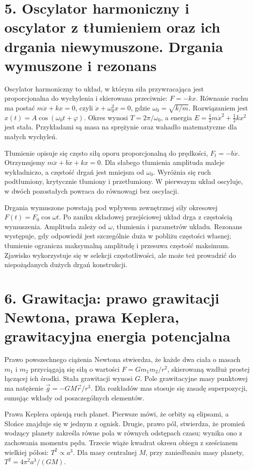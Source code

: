 \documentclass[11pt,a4paper,oneside]{report}
\begin{document}
\section{5. Oscylator harmoniczny i oscylator z tłumieniem oraz ich drgania niewymuszone. Drgania wymuszone i rezonans}
Oscylator harmoniczny to układ, w którym siła przywracająca jest proporcjonalna do wychylenia i skierowana przeciwnie: \(F=-kx\). Równanie ruchu ma postać \(m\ddot x+kx=0\), czyli \(\ddot x+\omega_0^2x=0\), gdzie \(\omega_0=\sqrt{k/m}\). Rozwiązaniem jest \(x(t)=A\cos(\omega_0t+\varphi)\). Okres wynosi \(T=2\pi/\omega_0\), a energia \(E=\frac12m\dot x^2+\frac12kx^2\) jest stała. Przykładami są masa na sprężynie oraz wahadło matematyczne dla małych wychyleń.

Tłumienie opisuje się często siłą oporu proporcjonalną do prędkości, \(F_t=-b\dot x\). Otrzymujemy \(m\ddot x+b\dot x+kx=0\). Dla słabego tłumienia amplituda maleje wykładniczo, a częstość drgań jest mniejsza od \(\omega_0\). Wyróżnia się ruch podtłumiony, krytycznie tłumiony i przetłumiony. W pierwszym układ oscyluje, w dwóch pozostałych powraca do równowagi bez oscylacji.

Drgania wymuszone powstają pod wpływem zewnętrznej siły okresowej \(F(t)=F_0\cos\omega t\). Po zaniku składowej przejściowej układ drga z częstością wymuszenia. Amplituda zależy od \(\omega\), tłumienia i parametrów układu. Rezonans występuje, gdy odpowiedź jest szczególnie duża w pobliżu częstości własnej; tłumienie ogranicza maksymalną amplitudę i przesuwa częstość maksimum. Zjawisko wykorzystuje się w selekcji częstotliwości, ale może też prowadzić do niepożądanych dużych drgań konstrukcji.

\section{6. Grawitacja: prawo grawitacji Newtona, prawa Keplera, grawitacyjna energia potencjalna}
Prawo powszechnego ciążenia Newtona stwierdza, że każde dwa ciała o masach \(m_1\) i \(m_2\) przyciągają się siłą o wartości \(F=Gm_1m_2/r^2\), skierowaną wzdłuż prostej łączącej ich środki. Stała grawitacji wynosi \(G\). Pole grawitacyjne masy punktowej ma natężenie \(\vec g=-GM\vec r/r^3\). Dla rozkładów mas stosuje się zasadę superpozycji, sumując wkłady od poszczególnych elementów.

Prawa Keplera opisują ruch planet. Pierwsze mówi, że orbity są elipsami, a Słońce znajduje się w jednym z ognisk. Drugie, prawo pól, stwierdza, że promień wodzący planety zakreśla równe pola w równych odstępach czasu; wynika ono z zachowania momentu pędu. Trzecie wiąże kwadrat okresu obiegu z sześcianem wielkiej półosi: \(T^2\propto a^3\). Dla masy centralnej \(M\), przy zaniedbaniu masy planety, \(T^2=4\pi^2a^3/(GM)\).
\end{document}
